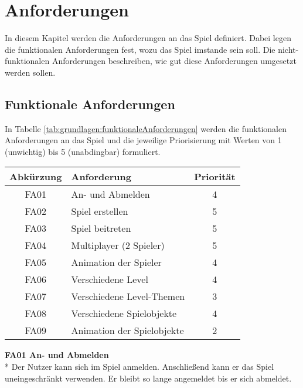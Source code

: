 \chapter{Anforderungen}
\label{cha:anforderungen}
In diesem Kapitel werden die Anforderungen an das Spiel definiert. Dabei legen die funktionalen Anforderungen fest, wozu das Spiel imstande sein soll. Die nicht-funktionalen Anforderungen beschreiben, wie gut diese Anforderungen umgesetzt werden sollen.

\section{Funktionale Anforderungen}
\label{sec:grundlagen:funktionaleAnforderungen}
In Tabelle \ref{tab:grundlagen:funktionaleAnforderungen} werden die funktionalen Anforderungen an das Spiel und die jeweilige Priorisierung mit Werten von 1 (unwichtig) bis 5 (unabdingbar) formuliert.

\begin{center}
    \label{tab:grundlagen:funktionaleAnforderungen}
    \begin{tabular}{ c | l | c}
        Abkürzung & Anforderung & Priorität\\
        \hline
        FA01 & An- und Abmelden & 4 \\
        \hline
        FA02 & Spiel erstellen & 5 \\
        \hline
        FA03 & Spiel beitreten & 5 \\
        \hline
        FA04 & Multiplayer (2 Spieler) & 5 \\
        \hline
        FA05 & Animation der Spieler & 4 \\
        \hline
        FA06 & Verschiedene Level & 4 \\
        \hline
        FA07 & Verschiedene Level-Themen & 3 \\
        \hline
        FA08 & Verschiedene Spielobjekte & 4 \\
        \hline
        FA09 & Animation der Spielobjekte & 2 \\
    \end{tabular}
\end{center}

\textbf{FA01 An- und Abmelden}\\*
Der Nutzer kann sich im Spiel anmelden. Anschließend kann er das Spiel uneingeschränkt verwenden. Er bleibt so lange angemeldet bis er sich abmeldet.

